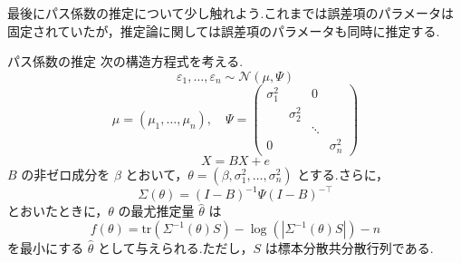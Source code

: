 \documentclass[uplatex, dvipdfmx]{jsarticle}
\begin{document}
最後にパス係数の推定について少し触れよう.これまでは誤差項のパラメータは固定されていたが，推定論に関しては誤差項のパラメータも同時に推定する.
\begin{prop}{パス係数の推定}
  次の構造方程式を考える.
  \begin{equation}
      \varepsilon_1, \dots, \varepsilon_n \sim \mathcal{N}(\mu, \Psi)
  \end{equation}
  \begin{equation}
      \mu = (\mu_1, \dots, \mu_n), \quad \Psi = 
      \begin{pmatrix}
          \sigma_1^2 & & 0 \\
          & \sigma_2^2 & \\
          & & \ddots & \\
          0 & & & \sigma_n^2
      \end{pmatrix}
  \end{equation}
  \begin{equation}
      X = BX + e
  \end{equation}
  $B$ の非ゼロ成分を $\beta$ とおいて，$\theta = (\beta, \sigma_1^2, \dots, \sigma_n^2)$ とする.さらに，
  \begin{equation}
      \Sigma(\theta) = (I - B)^{-1} \Psi (I - B)^{-\top}
  \end{equation}
  とおいたときに，$\theta$ の最尤推定量 $\hat{\theta}$ は
  \begin{equation}
      f(\theta) = \text{tr}(\Sigma^{-1}(\theta) S) - \log(|\Sigma^{-1}(\theta) S|) - n
  \end{equation}
  を最小にする $\hat{\theta}$ として与えられる.ただし，$S$ は標本分散共分散行列である.
\end{prop}
\end{document}
